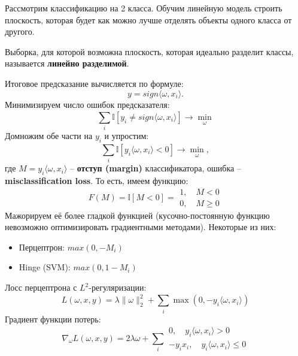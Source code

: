 \documentclass[a4paper, 10pt, openany]{book} %
\begin{document}
	Рассмотрим классификацию на 2 класса. Обучим линейную модель строить плоскость, которая будет как можно лучше отделять объекты одного класса от другого.
	
	Выборка, для которой возможна плоскость, которая идеально разделит классы, называется \textbf{линейно разделимой}.
	
	Итоговое предсказание вычисляется по формуле:
	\begin{equation*}
		y = sign\langle \omega,x_i \rangle.
	\end{equation*}
	Минимизируем число ошибок предсказателя:
	\begin{equation*}
		\sum_{i}^{} \mathbb{I}[y_i \not= sign\langle \omega,x_i \rangle] \rightarrow \min_\omega
	\end{equation*}
	Домножим обе части на $y_i$ и упростим:
	\begin{equation*}
		\sum_{i}^{} \mathbb{I}[y_i\langle \omega,x_i \rangle < 0] \rightarrow \min_\omega,
	\end{equation*}
	где $M = y_i\langle \omega,x_i \rangle$ -- \textbf{отступ (margin)} классификатора, ошибка -- \textbf{misclassification loss}.
	То есть, имеем функцию:
	\begin{equation*}
		F(M) = \mathbb{I}[M < 0] = 
		\begin{gathered}
			1,\quad M < 0 \\
			0,\quad M \geq 0
		\end{gathered}
	\end{equation*}
	Мажорируем её более гладкой функцией (кусочно-постоянную функцию невозможно оптимизировать градиентными методами). Некоторые из них:
	\begin{itemize}
		\item Перцептрон: $max(0, -M_i)$
		\item Hinge (SVM): $max(0, 1-M_i)$
	\end{itemize}
	
	Лосс перцептрона с $L^2$-регуляризации:
	\begin{equation*}
		L(\omega, x, y) = \lambda \|\omega\|^2_2 + \sum_{i}^{} \max(0,-y_i\langle \omega, x_i \rangle)
	\end{equation*}
	Градиент функции потерь:
	\begin{equation*}
		\nabla_\omega L(\omega, x, y) = 2 \lambda \omega + \sum_{i}^{}
		\begin{gathered}
			0,\quad y_i\langle \omega, x_i \rangle > 0 \\
			- y_i x_i,\quad y_i\langle \omega, x_i \rangle \leq 0
		\end{gathered}
	\end{equation*}
	
\end{document}
